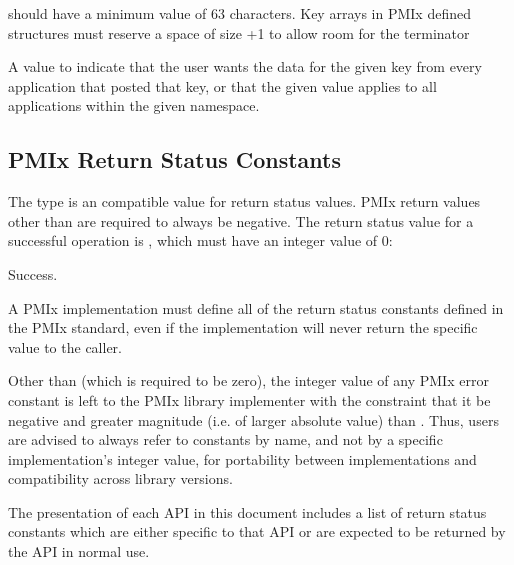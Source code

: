 \adviceimplstart
{} should have a minimum value of 63 characters. Key arrays in \ac{PMIx} defined structures must reserve
a space of size +1 to allow room for the  terminator
\adviceimplend

\begin{constantdesc}
%
A value to indicate that the user wants the data for the given key from every application that posted that key, or that the given value applies to all applications within the given namespace.
\end{constantdesc}


\subsection{PMIx Return Status Constants}
\label{api:struct:errors}

The  type is an  compatible value for return status values.
\ac{PMIx} return values other than  are required to always be negative.  The return status value for a successful operation is
, which must have an integer value of 0:
 
\begin{constantdesc}
Success.
\end{constantdesc}

\adviceimplstart
A \ac{PMIx} implementation must define all of the return status constants defined in the \ac{PMIx} standard, even if the implementation will never return the specific value to the caller.
\adviceimplend

\adviceuserstart
Other than  (which is required to be zero), the integer value of any \ac{PMIx} error constant is left to the \ac{PMIx} library implementer with the constraint that it be negative and greater magnitude (i.e. of larger absolute value) 
than
.
Thus, users are advised to always refer to constants by name, and not by a specific implementation's integer value, for portability between implementations and compatibility across library versions.
\adviceuserend

The presentation of each \ac{API} in this document includes a list of return status constants which are either specific to that \ac{API} or are expected to be returned by the \ac{API} in normal use.

